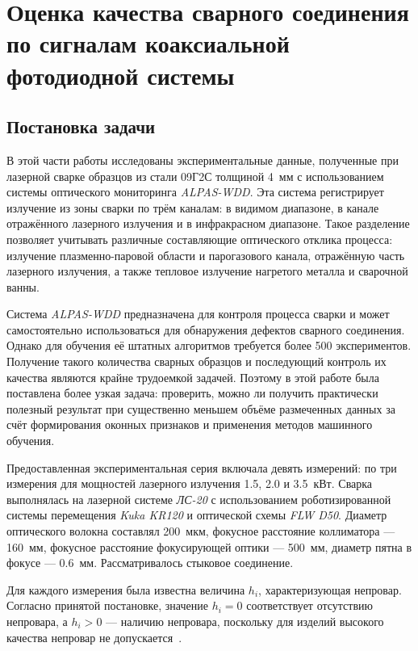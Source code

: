 \chapter{Оценка качества сварного соединения по сигналам коаксиальной фотодиодной системы}

\section{Постановка задачи}

В этой части работы исследованы экспериментальные данные, полученные при лазерной сварке образцов из стали 09Г2С толщиной 4~мм с использованием системы оптического мониторинга \textit{ALPAS-WDD}. Эта система регистрирует излучение из зоны сварки по трём каналам: в видимом диапазоне, в канале отражённого лазерного излучения и в инфракрасном диапазоне. Такое разделение позволяет учитывать различные составляющие оптического отклика процесса: излучение плазменно-паровой области и парогазового канала, отражённую часть лазерного излучения, а также тепловое излучение нагретого металла и сварочной ванны.

Система \textit{ALPAS-WDD} предназначена для контроля процесса сварки и может самостоятельно использоваться для обнаружения дефектов сварного соединения. Однако для обучения её штатных алгоритмов требуется более 500 экспериментов. Получение такого количества сварных образцов и последующий контроль их качества являются крайне трудоемкой задачей. Поэтому в этой работе была поставлена более узкая задача: проверить, можно ли получить практически полезный результат при существенно меньшем объёме размеченных данных за счёт формирования оконных признаков и применения методов машинного обучения.

Предоставленная экспериментальная серия включала девять измерений: по три измерения для мощностей лазерного излучения 1.5, 2.0 и 3.5~кВт. Сварка выполнялась на лазерной системе \textit{ЛС-20} с использованием роботизированной системы перемещения \textit{Kuka KR120} и оптической схемы \textit{FLW D50}. Диаметр оптического волокна составлял 200~мкм, фокусное расстояние коллиматора --- 160~мм, фокусное расстояние фокусирующей оптики --- 500~мм, диаметр пятна в фокусе --- 0.6~мм. Рассматривалось стыковое соединение.

Для каждого измерения была известна величина \(h_i\), характеризующая непровар. Согласно принятой постановке, значение \(h_i = 0\) соответствует отсутствию непровара, а \(h_i > 0\) --- наличию непровара, поскольку для изделий высокого качества непровар не допускается~\cite{gost_iso_13919_1_2025}.

